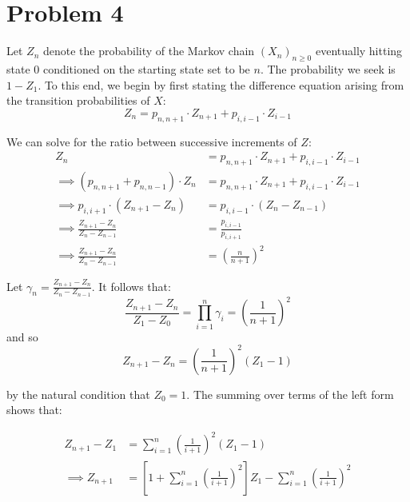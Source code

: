 \documentclass[12pt]{article}%
\begin{document}
\section{Problem 4}
\label{sec:problem-4}

Let $Z_{n}$ denote the probability of the Markov chain $(X_n)_{n \geq 0}$ eventually hitting state 0 conditioned on the starting state set to be $n$. The probability we seek is $1 - Z_{1}$. To this end, we begin by first stating the difference equation arising from the transition probabilities of $X$: \[ Z_{n} = p_{n,n+1}\cdot Z_{n+1} + p_{i,i-1}\cdot Z_{i-1} \]


We can solve for the ratio between successive increments of $Z$:
%
\begin{align*}
   Z_{n} & = p_{n,n+1}\cdot Z_{n+1} + p_{i,i-1}\cdot Z_{i-1} \\
  \implies  ( p_{n,n+1} +  p_{n,n-1})\cdot  Z_n  & = p_{n,n+1}\cdot Z_{n+1} + p_{i,i-1}\cdot Z_{i-1} \\
  \implies  p_{i,i+1} \cdot (Z_{{n+1}} - Z_{n})  & = p_{i,i-1} \cdot (Z_n - Z_{{n-1}}) \\
  \implies \frac{Z_{{n+1}} - Z_n}{Z_n - Z_{n-1}} & = \frac{p_{i,i-1}}{p_{i,i+1}} \\
  \implies \frac{Z_{{n+1}} - Z_n}{Z_n - Z_{n-1}} & = \left(\frac{n}{n+1}\right)^{2}
\end{align*}

Let $\gamma_{n} = \frac{Z_{{n+1}} - Z_n}{Z_n - Z_{n-1}}$. It follows that:
\[\frac{Z_{n+1} - Z_{n}}{Z_{1} - Z_{0}} = \prod_{i=1}^{n} \gamma_{i} = \left(\frac{1}{n+1}\right)^{2}\]
and so
\[Z_{n+1} - Z_{n} =  \left(\frac{1}{n+1}\right)^{2}(Z_{1} - 1)\]

by the natural condition that $Z_{0} = 1$. The summing over terms of the left form shows that:

\begin{equation*}
  \label{eq:2}
  \begin{split}
    Z_{n+1} - Z_{1} & = \sum_{i = 1}^n \left(\frac{1}{i+1}\right)^{2} (Z_{1} - 1) \\
    \implies Z_{n+1} & = \left[1 +  \sum_{i = 1}^n \left(\frac{1}{i+1}\right)^{2}\right]Z_{1} -  \sum_{i = 1}^n \left(\frac{1}{i+1}\right)^{2}
  \end{split}
\end{equation*}
\end{document}
